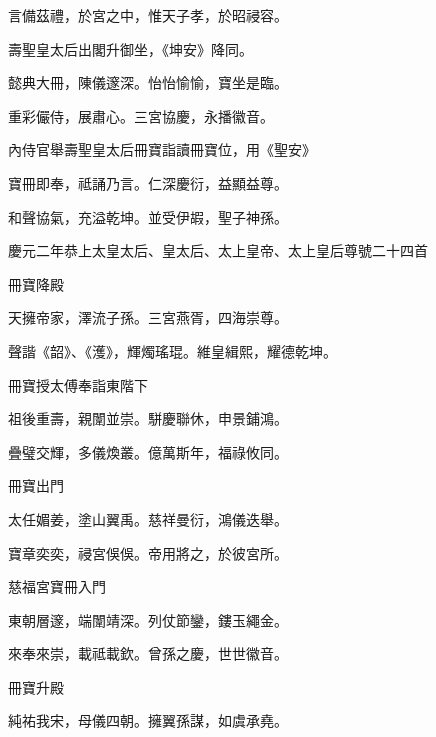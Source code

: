 \begin{pinyinscope}
 言備茲禮，於宮之中，惟天子孝，於昭祲容。



 壽聖皇太后出閣升御坐，《坤安》降同。



 懿典大冊，陳儀邃深。怡怡愉愉，寶坐是臨。



 重彩儼侍，展肅心。三宮協慶，永播徽音。



 內侍官舉壽聖皇太后冊寶詣讀冊寶位，用《聖安》



 寶冊即奉，祗誦乃言。仁深慶衍，益顯益尊。



 和聲協氣，充溢乾坤。並受伊嘏，聖子神孫。



 慶元二年恭上太皇太后、皇太后、太上皇帝、太上皇后尊號二十四首



 冊寶降殿



 天擁帝家，澤流子孫。三宮燕胥，四海崇尊。



 聲諧《韶》、《濩》，輝燭瑤琨。維皇緝熙，耀德乾坤。



 冊寶授太傅奉詣東階下



 祖後重壽，親闈並崇。駢慶聯休，申景鋪鴻。



 疊璧交輝，多儀煥叢。億萬斯年，福祿攸同。



 冊寶出門



 太任媚姜，塗山翼禹。慈祥曼衍，鴻儀迭舉。



 寶章奕奕，祲宮俁俁。帝用將之，於彼宮所。



 慈福宮寶冊入門



 東朝層邃，端闈靖深。列仗節鑾，鏤玉繩金。



 來奉來崇，載祗載欽。曾孫之慶，世世徽音。



 冊寶升殿



 純祐我宋，母儀四朝。擁翼孫謀，如虞承堯。




\end{pinyinscope}
